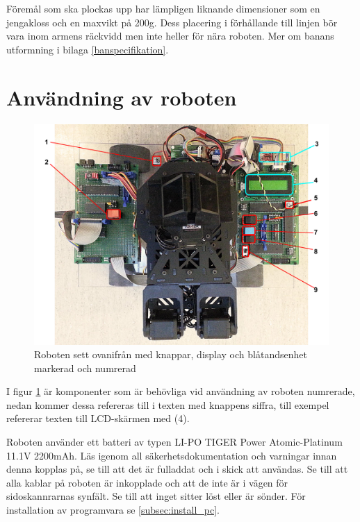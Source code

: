\documentclass[a4paper,12pt]{article}
\begin{document}
Föremål som ska plockas upp har lämpligen liknande dimensioner som en jengakloss och en maxvikt på 200g. Dess placering i förhållande till linjen bör vara inom armens räckvidd men inte heller för nära roboten. Mer om banans utformning i bilaga \ref{banspecifikation}.  

%
%

\section{Användning av roboten}
\begin{figure}[H]
	\centering
	\includegraphics[width=1.0\textwidth]{oversikt_handledning.pdf}
	\caption{Roboten sett ovanifrån med knappar, display och blåtandsenhet markerad och numrerad}
	\label{fig:robot_oversikt}
\end{figure}

I figur \ref{fig:robot_oversikt} är komponenter som är behövliga vid användning av roboten numrerade, nedan kommer dessa refereras till i texten med knappens siffra, till exempel refererar texten till LCD-skärmen med (4).

Roboten använder ett batteri av typen LI-PO TIGER Power Atomic-Platinum 11.1V 2200mAh. Läs igenom all säkerhetsdokumentation och varningar innan denna kopplas på, se till att det är fulladdat och i skick att användas. Se till att alla kablar på roboten är inkopplade och att de inte är i vägen för sidoskannrarnas synfält. Se till att inget sitter löst eller är sönder. För installation av programvara se \ref{subsec:install_pc}.
\end{document}
